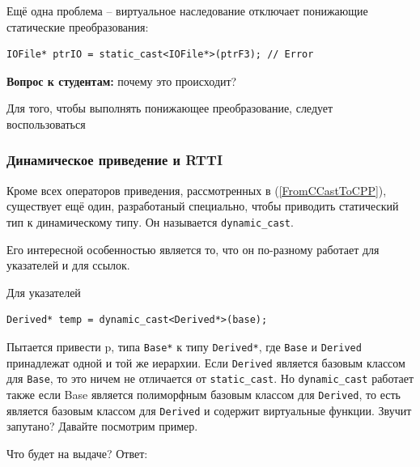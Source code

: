 \documentclass[a4paper,12pt,oneside]{article}
\newif\ifanswers
\begin{document}
Ещё одна проблема -- виртуальное наследование отключает понижающие статические преобразования:

\begin{lstlisting}
IOFile* ptrIO = static_cast<IOFile*>(ptrF3); // Error
\end{lstlisting}

\textbf{Вопрос к студентам:} почему это происходит?

\ifanswers
Правильный ответ: потому что для реконструкции объекта с виртуальным наследованием, компилятор должен пройти по каждой из возможных цепочек виртуального наследования и создать каждый из подобъектов. Это неконстантный оверхед по времени и памяти и разработчики языка не стали его закладывать в обычное преобразование.
\fi

Для того, чтобы выполнять понижающее преобразование, следует воспользоваться

\subsubsection{Динамическое приведение и RTTI}\label{DynCastRTTI}

Кроме всех операторов приведения, рассмотренных в (\ref{FromCCastToCPP}), существует ещё один, разработаный специально, чтобы приводить статический тип к динамическому типу. Он называется \lstinline!dynamic_cast!. 

Его интересной особенностью является то, что он по-разному работает для указателей и для ссылок. 

Для указателей

\begin{lstlisting}
Derived* temp = dynamic_cast<Derived*>(base);
\end{lstlisting}

Пытается привести p, типа \lstinline!Base*! к типу \lstinline!Derived*!, где \lstinline!Base! и \lstinline!Derived! принадлежат одной и той же иерархии. Если \lstinline!Derived! является базовым классом для \lstinline!Base!, то это ничем не отличается от \lstinline!static_cast!. Но \lstinline!dynamic_cast! работает также если Base является полиморфным базовым классом для \lstinline!Derived!, то есть является базовым классом для \lstinline!Derived! и содержит виртуальные функции. Звучит запутано? Давайте посмотрим пример.



Что будет на выдаче? Ответ:
\end{document}
